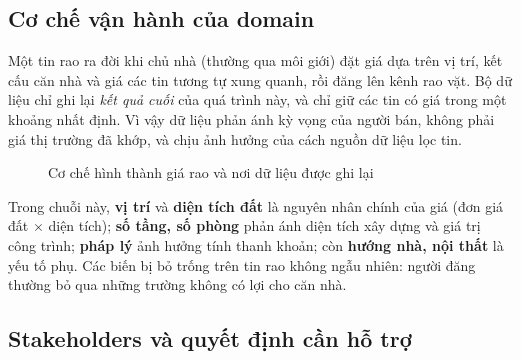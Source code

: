 \documentclass[11pt]{article}
\begin{document}
\subsection{Cơ chế vận hành của domain}

Một tin rao ra đời khi chủ nhà (thường qua môi giới) đặt giá dựa trên vị trí, kết cấu căn nhà và giá
các tin tương tự xung quanh, rồi đăng lên kênh rao vặt. Bộ dữ liệu chỉ ghi lại \textit{kết quả cuối}
của quá trình này, và chỉ giữ các tin có giá trong một khoảng nhất định. Vì vậy dữ liệu phản ánh kỳ vọng
của người bán, không phải giá thị trường đã khớp, và chịu ảnh hưởng của cách nguồn dữ liệu lọc tin.

\begin{figure}[H]
\centering
{}
\caption{Cơ chế hình thành giá rao và nơi dữ liệu được ghi lại}
\end{figure}

Trong chuỗi này, \textbf{vị trí} và \textbf{diện tích đất} là nguyên nhân chính của giá (đơn giá đất
$\times$ diện tích); \textbf{số tầng, số phòng} phản ánh diện tích xây dựng và giá trị công trình;
\textbf{pháp lý} ảnh hưởng tính thanh khoản; còn \textbf{hướng nhà, nội thất} là yếu tố phụ. Các biến
bị bỏ trống trên tin rao không ngẫu nhiên: người đăng thường bỏ qua những trường không có lợi cho căn nhà.

\subsection{Stakeholders và quyết định cần hỗ trợ}
\end{document}
